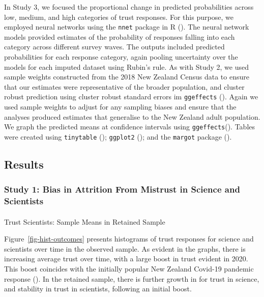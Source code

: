 \documentclass[
  single column]{article}
\makeatletter
\let\oldparagraph\paragraph
\renewcommand{\paragraph}{
    \@ifstar
      \xxxParagraphStar
      \xxxParagraphNoStar
  }
\newcommand{\xxxParagraphStar}[1]{\oldparagraph*{#1}\mbox{}}
\newcommand{\xxxParagraphNoStar}[1]{\oldparagraph{#1}\mbox{}}
\makeatother
\begin{document}
In Study 3, we focused the proportional change in predicted
probabilities across low, medium, and high categories of trust
responses. For this purpose, we employed neural networks using the
\texttt{nnet} package in R (). The neural network models provided estimates of the probability
of responses falling into each category across different survey waves.
The outputs included predicted probabilities for each response category,
again pooling uncertainty over the models for each imputed dataset using
Rubin's rule. As with Study 2, we used sample weights constructed from
the 2018 New Zealand Census data to ensure that our estimates were
representative of the broader population, and cluster robust prediction
using cluster robust standard errors im \texttt{ggeffects}
(). Again we used sample
weights to adjust for any sampling biases and ensure that the analyses
produced estimates that generalise to the New Zealand adult population.
We graph the predicted means at confidence intervals using
\texttt{ggeffects}(). Tables
were created using \texttt{tinytable}
(); \texttt{ggplot2}
(); and the \texttt{margot}
package ().

\subsection{Results}\label{results}

\subsubsection{Study 1: Bias in Attrition From Mistrust in Science and
Scientists}\label{study-1-bias-in-attrition-from-mistrust-in-science-and-scientists}

\paragraph{Trust Scientists: Sample Means in Retained
Sample}\label{trust-scientists-sample-means-in-retained-sample}

Figure~\ref{fig-hist-outcomes} presents histograms of trust responses
for science and scientists over time in the observed sample. As evident
in the graphs, there is increasing average trust over time, with a large
boost in trust evident in 2020. This boost coincides with the initially
popular New Zealand Covid-19 pandemic response
(). In the retained
sample, there is further growth in for trust in science, and stability
in trust in scientists, following an initial boost.
\end{document}
